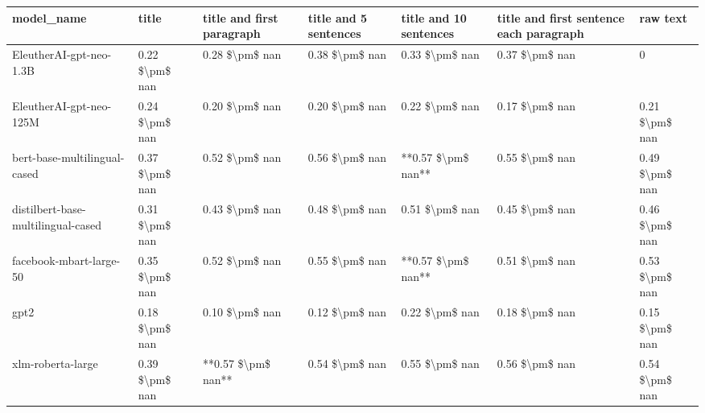 \begin{tabular}{lllllll}
\toprule
                        model\_name &          title & title and first paragraph & title and 5 sentences & title and 10 sentences & title and first sentence each paragraph &       raw text \\
\midrule
           EleutherAI-gpt-neo-1.3B & 0.22 \$\textbackslash pm\$ nan &            0.28 \$\textbackslash pm\$ nan &        0.38 \$\textbackslash pm\$ nan &         0.33 \$\textbackslash pm\$ nan &                          0.37 \$\textbackslash pm\$ nan &              0 \\
           EleutherAI-gpt-neo-125M & 0.24 \$\textbackslash pm\$ nan &            0.20 \$\textbackslash pm\$ nan &        0.20 \$\textbackslash pm\$ nan &         0.22 \$\textbackslash pm\$ nan &                          0.17 \$\textbackslash pm\$ nan & 0.21 \$\textbackslash pm\$ nan \\
      bert-base-multilingual-cased & 0.37 \$\textbackslash pm\$ nan &            0.52 \$\textbackslash pm\$ nan &        0.56 \$\textbackslash pm\$ nan &     **0.57 \$\textbackslash pm\$ nan** &                          0.55 \$\textbackslash pm\$ nan & 0.49 \$\textbackslash pm\$ nan \\
distilbert-base-multilingual-cased & 0.31 \$\textbackslash pm\$ nan &            0.43 \$\textbackslash pm\$ nan &        0.48 \$\textbackslash pm\$ nan &         0.51 \$\textbackslash pm\$ nan &                          0.45 \$\textbackslash pm\$ nan & 0.46 \$\textbackslash pm\$ nan \\
           facebook-mbart-large-50 & 0.35 \$\textbackslash pm\$ nan &            0.52 \$\textbackslash pm\$ nan &        0.55 \$\textbackslash pm\$ nan &     **0.57 \$\textbackslash pm\$ nan** &                          0.51 \$\textbackslash pm\$ nan & 0.53 \$\textbackslash pm\$ nan \\
                              gpt2 & 0.18 \$\textbackslash pm\$ nan &            0.10 \$\textbackslash pm\$ nan &        0.12 \$\textbackslash pm\$ nan &         0.22 \$\textbackslash pm\$ nan &                          0.18 \$\textbackslash pm\$ nan & 0.15 \$\textbackslash pm\$ nan \\
                 xlm-roberta-large & 0.39 \$\textbackslash pm\$ nan &        **0.57 \$\textbackslash pm\$ nan** &        0.54 \$\textbackslash pm\$ nan &         0.55 \$\textbackslash pm\$ nan &                          0.56 \$\textbackslash pm\$ nan & 0.54 \$\textbackslash pm\$ nan \\
\bottomrule
\end{tabular}
